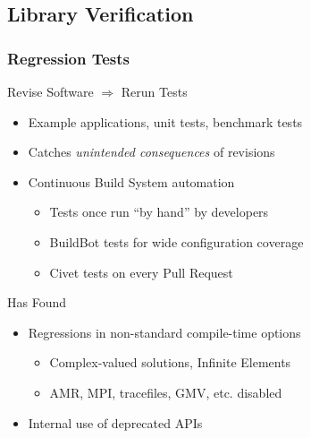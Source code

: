 \subsection{Library Verification}

\begin{frame}
\frametitle{Regression Tests}
\begin{block}{Revise Software $\Rightarrow$ Rerun Tests}
\begin{itemize}
\item Example applications, unit tests, benchmark tests
\item Catches {\textit{unintended consequences}} of revisions
\item Continuous Build System automation
\begin{itemize}
\item Tests once run ``by hand'' by \libMesh{} developers
\item BuildBot tests for wide configuration coverage
\item Civet tests on every Pull Request
\end{itemize}
\end{itemize}
\end{block}

\pause

\begin{block}{Has Found}
\begin{itemize}
\item Regressions in non-standard compile-time options
  \begin{itemize}
  \item Complex-valued solutions, Infinite Elements
  \item AMR, MPI, tracefiles, GMV, etc. disabled
  \end{itemize}
\item Internal use of deprecated APIs
\end{itemize}
\end{block}
\end{frame}


